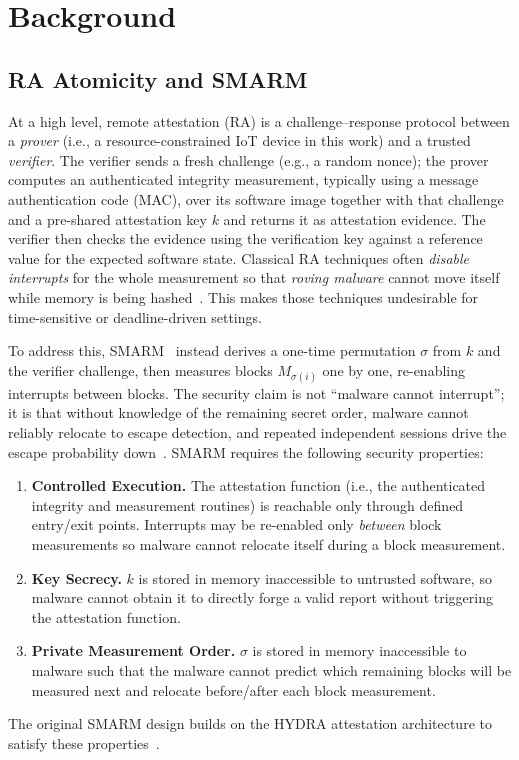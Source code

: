 \documentclass[conference]{IEEEtran}
\newcommand\oak[1]{\textcolor{red}{OAK: #1}}
\begin{document}
\section{Background}
\label{sec:background}

\subsection{RA Atomicity and SMARM}

At a high level, remote attestation (RA) is a challenge--response
protocol between a \emph{prover} (i.e., a resource-constrained IoT device in this work) and a trusted \emph{verifier}.
The verifier sends a fresh challenge (e.g., a random nonce); 
the prover computes an authenticated integrity measurement, typically using a message authentication code (MAC), over its software image together with that challenge and a pre-shared attestation key $k$ and returns it as attestation evidence. 
The verifier then checks the evidence using the verification key against a reference value for the expected software state.
Classical RA techniques often \emph{disable interrupts} for the whole measurement so that \emph{roving malware} cannot move itself while memory is being hashed~\cite{eldefrawy2012smart,nunes2019vrased}.
This makes those techniques undesirable for time-sensitive or deadline-driven settings.

To address this, SMARM~\cite{carpent2018smarm} instead derives a one-time permutation $\sigma$ from $k$ and the verifier challenge, then measures blocks $M_{\sigma(i)}$ one by one, re-enabling interrupts between blocks.
The security claim is not ``malware cannot interrupt''; it is that without knowledge of the remaining secret order, malware cannot reliably relocate to escape detection, and repeated independent sessions drive the escape probability down~\cite{carpent2018smarm}.
SMARM requires the following security properties:
\begin{enumerate}
  \item[\textbf{[S1]}] \textbf{Controlled Execution.}
    The attestation function (i.e., the authenticated integrity and measurement routines) is reachable only through defined
    entry/exit points. Interrupts may be re-enabled only
    \emph{between} block measurements so malware cannot relocate itself during a block measurement.
  \item[\textbf{[S2]}] \textbf{Key Secrecy.}
    $k$ is stored in memory inaccessible to
    untrusted software, so malware cannot obtain it to directly forge a valid report without triggering the attestation function.
  \item[\textbf{[S3]}] \textbf{Private Measurement Order.}
    $\sigma$ is stored in memory inaccessible to malware such that the malware cannot predict which remaining blocks will be measured next and relocate before/after each block measurement.
\end{enumerate}
The original SMARM design builds on the HYDRA attestation architecture to satisfy these properties~\cite{eldefrawy2017hydra}.
\end{document}
